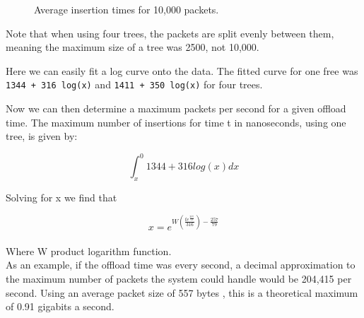 \documentclass[12pt,twoside]{article}
\begin{document}
\begin{figure}[h]
	\centering
	\qquad
	\caption{Average insertion times for 10,000 packets.}
	\label{insertion_time}
\end{figure}


Note that when using four trees, the packets are split evenly between them, meaning the maximum size of a tree was 2500, not 10,000.

Here we can easily fit a log curve onto the data. The fitted curve for one free was \texttt{1344 + 316 log(x)} and \texttt{1411 + 350 log(x)} for four trees. 

Now we can then determine a maximum packets per second for a given offload time. The maximum number of insertions for time t in nanoseconds, using one tree, is given by:

\begin{equation}
	\int_{x}^{0} 1344 + 316 log(x) dx
\end{equation}

Solving for x we find that

\begin{equation}
	 x = e^{W(\frac{t e^{\frac{257}{79}}}{316}) - \frac{257}{79}} 
\end{equation}
\\
Where W product logarithm function.\\
As an example, if the offload time was every second, a decimal approximation to the maximum number of packets the system could handle would be 204,415 per second. Using an average packet size of 557 bytes \cite{avg_pkt}, this is a theoretical maximum of 0.91 gigabits a second.
\end{document}
